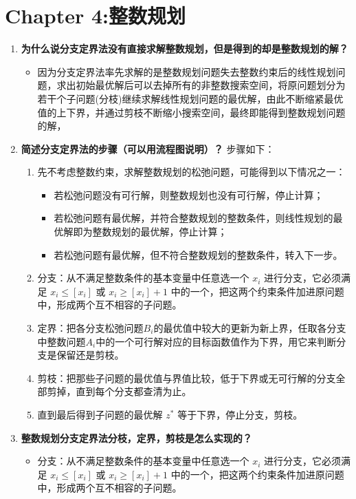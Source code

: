 	\section{Chapter 4:整数规划}
	\begin{enumerate}
		\item \textbf{为什么说分支定界法没有直接求解整数规划，但是得到的却是整数规划的解？}
		\begin{itemize}
			\item 因为分支定界法率先求解的是整数规划问题失去整数约束后的线性规划问题，求出初始最优解后可以去掉所有的非整数搜索空间，将原问题划分为若干个子问题(分枝)继续求解线性规划问题的最优解，由此不断缩紧最优值的上下界，并通过剪枝不断缩小搜索空间，最终即能得到整数规划问题的解，
		\end{itemize}
		\item \textbf{简述分支定界法的步骤（可以用流程图说明）？}
		步骤如下：
		\begin{enumerate}
			\item 先不考虑整数约束，求解整数规划的松弛问题，可能得到以下情况之一：
			\begin{itemize}
				\item 若松弛问题没有可行解，则整数规划也没有可行解，停止计算；
				\item 若松弛问题有最优解，并符合整数规划的整数条件，则线性规划的最优解即为整数规划的最优解，停止计算；
				\item 若松弛问题有最优解，但不符合整数规划的整数条件，转入下一步。
			\end{itemize}
			\item 分支：从不满足整数条件的基本变量中任意选一个 $x_i$ 进行分支，它必须满足 $x_i \leq [x_i]$ 或 $x_i \geq [x_i] + 1$ 中的一个，把这两个约束条件加进原问题中，形成两个互不相容的子问题。

			\item 定界：把各分支松弛问题$B_i$的最优值中较大的更新为新上界，任取各分支中整数问题$A_i$中的一个可行解对应的目标函数值作为下界，用它来判断分支是保留还是剪枝。

			\item 剪枝：把那些子问题的最优值与界值比较，低于下界或无可行解的分支全部剪掉，直到每个分支都查清为止。

			\item 直到最后得到子问题的最优解 $z^*$ 等于下界，停止分支，剪枝。
		\end{enumerate}

		\item \textbf{整数规划分支定界法分枝，定界，剪枝是怎么实现的？}
		\begin{itemize}
			\item 分支：从不满足整数条件的基本变量中任意选一个 $x_i$ 进行分支，它必须满足 $x_i \leq [x_i]$ 或 $x_i \geq [x_i] + 1$ 中的一个，把这两个约束条件加进原问题中，形成两个互不相容的子问题。


\end{itemize}
\end{enumerate}
